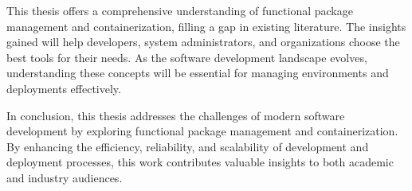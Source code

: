 This thesis offers a comprehensive understanding of functional package management
and containerization, filling a gap in existing literature.
The insights gained will help developers, system administrators,
and organizations choose the best tools for their needs.
As the software development landscape evolves,
understanding these concepts will be essential for managing environments and deployments effectively.

In conclusion, this thesis addresses the challenges of modern software development
by exploring functional package management and containerization.
By enhancing the efficiency, reliability, and scalability of development and deployment processes,
this work contributes valuable insights to both academic and industry audiences.




